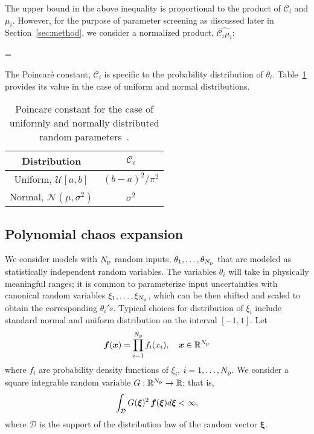 \noindent The upper bound in the above inequality is proportional to the product of $\mathcal{C}_i$
and $\mu_i$. However, for the purpose of parameter screening as discussed later in
Section~\ref{sec:method}, we consider a normalized product, $\widehat{\mathcal{C}_i\mu_i}$:

\be
{} = 
\label{eq:cmu}
\ee

\noindent The Poincar\'e constant, $\mathcal{C}_i$ is specific to the probability distribution of $\theta_i$.
Table~\ref{tab:poincare} provides its value in the case of uniform and normal
distributions.
\bigskip

\begin{table}[htbp]
\renewcommand*{\arraystretch}{1.2}
\begin{center}
\begin{tabular}{|c|c|}
\hline
Distribution & $\mathcal{C}_i$ \\ \hline \hline 
Uniform, $\mathcal{U}[a, b]$ & $(b-a)^{2}/\pi^2$ \\ 
Normal, $\mathcal{N}(\mu,\sigma^2)$ & $\sigma^2$ \\ 
\hline
\end{tabular}
\end{center}

\caption{Poincare constant for the case of uniformly and normally distributed random
parameters~\cite{Roustant:2014}.}
\label{tab:poincare}
\end{table}

\subsection{Polynomial chaos expansion}

We consider models with ${N_\text{p}}$ random inputs, 
$\theta_1, \ldots, \theta_{N_\text{p}}$ that are modeled
as statistically independent random variables. The 
variables $\theta_i$ will take in physically meaningful
ranges; it is common to parameterize input uncertainties
with canonical random variables $\xi_1, \ldots, \xi_{N_\text{p}}$,
which can be then shifted and scaled to obtain the corresponding $\theta_i's$.
Typical choices for distribution of $\xi_i$ include standard normal 
and uniform distribution on the interval $[-1, 1]$.
Let 
\[
   \bm{f}(\bm{x}) = \prod_{i=1}^{N_\text{p}} f_i(x_i), \quad \bm{x} \in \mathbb{R}^{N_\text{p}}
\]
where $f_i$ are probability density functions of $\xi_i$, $i = 1, \ldots, {N_\text{p}}$.
We consider a square integrable random variable $G:\mathbb{R}^{N_\text{p}} \to \mathbb{R}$; 
that is,
\[
\int_{\mathcal{D}} G(\bm{\xi})^2 \, \bm{f}(\bm{\xi})d\bm{\xi} < \infty,
\]
where $\mathcal{D}$ is the support of the distribution law of the random vector
$\bm{\xi}$. 



